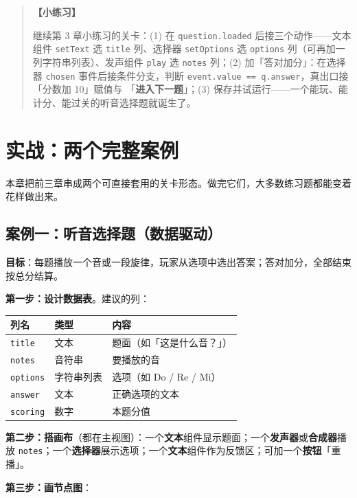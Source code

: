 \documentclass[UTF8,a4paper,zihao=-4]{ctexart}
\newcommand{\code}[1]{\texttt{#1}}   %
\newcommand{\ui}[1]{「\textbf{#1}」}  %
\newenvironment{practice}{%
  \begin{quote}\small\textbf{【小练习】}\ignorespaces
}{\end{quote}}
\begin{document}
\begin{practice}
继续第 3 章小练习的关卡：(1) 在 \code{question.loaded} 后接三个动作——文本组件 \code{setText} 选 \code{title} 列、选择器 \code{setOptions} 选 \code{options} 列（可再加一列字符串列表）、发声组件 \code{play} 选 \code{notes} 列；(2) 加「答对加分」：在选择器 \code{chosen} 事件后接条件分支，判断 \code{event.value == q.answer}，真出口接「分数加 10」赋值与 \ui{进入下一题}；(3) 保存并试运行——一个能玩、能计分、能过关的听音选择题就诞生了。
\end{practice}

\section{实战：两个完整案例}

本章把前三章串成两个可直接套用的关卡形态。做完它们，大多数练习题都能变着花样做出来。

\subsection{案例一：听音选择题（数据驱动）}

\textbf{目标}：每题播放一个音或一段旋律，玩家从选项中选出答案；答对加分，全部结束按总分结算。

\textbf{第一步：设计数据表}。建议的列：

\begin{center}
\begin{tabular}{lll}
\toprule
列名 & 类型 & 内容 \\
\midrule
\code{title} & 文本 & 题面（如「这是什么音？」） \\
\code{notes} & 音符串 & 要播放的音 \\
\code{options} & 字符串列表 & 选项（如 Do / Re / Mi） \\
\code{answer} & 文本 & 正确选项的文本 \\
\code{scoring} & 数字 & 本题分值 \\
\bottomrule
\end{tabular}
\end{center}

\textbf{第二步：搭画布}（都在主视图）：一个\textbf{文本}组件显示题面；一个\textbf{发声器}或\textbf{合成器}播放 \code{notes}；一个\textbf{选择器}展示选项；一个\textbf{文本}组件作为反馈区；可加一个\textbf{按钮}「重播」。

\textbf{第三步：画节点图}：
\end{document}
